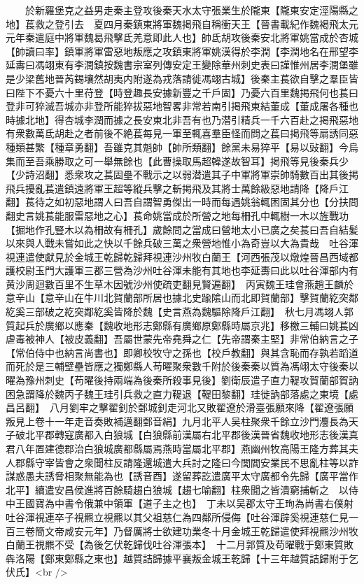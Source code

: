 　　於新羅堡克之益男走秦主登攻後秦天水太守張業生於隴東【隴東安定涇陽縣之地】萇救之登引去　夏四月秦鎮東將軍魏掲飛自稱衝天王【晉書載紀作魏褐飛太元元年秦遣庭中將軍魏曷飛擊氐羌意即此人也】帥氐胡攻後秦安北將軍姚當成於杏城【帥讀曰率】鎮軍將軍雷惡地叛應之攻鎮東將軍姚漢得於李潤【李潤地名在邢望李延夀曰馮翊東有李潤鎮按魏書宗室列傳安定王變除華州刺史表曰謹惟州居李潤堡雖是少梁舊地晉芮錫壤然胡夷内附遂為戎落請徙馮翊古城】後秦主萇欲自擊之羣臣皆曰陛下不憂六十里苻登【時登趣長安據新豐之千戶固】乃憂六百里魏掲飛何也萇曰登非可猝滅吾城亦非登所能猝拔惡地智畧非常若南引掲飛東結董成【董成屠各種也時據北地】得杏城李潤而據之長安東北非吾有也乃潜引精兵一千六百赴之掲飛惡地有衆數萬氐胡赴之者前後不絶萇每見一軍至輒喜羣臣怪而問之萇曰掲飛等扇誘同惡種類甚繁【種章勇翻】吾雖克其魁帥【帥所類翻】餘黨未易猝平【易以䜴翻】今烏集而至吾乘勝取之可一舉無餘也【此曹操取馬超韓遂故智耳】掲飛等見後秦兵少【少詩沼翻】悉衆攻之萇固壘不戰示之以弱潜遣其子中軍將軍崇帥騎數百出其後掲飛兵擾亂萇遣鎮遠將軍王超等縱兵擊之斬掲飛及其將士萬餘級惡地請降【降戶江翻】萇待之如初惡地謂人曰吾自謂智勇傑出一時而每遇姚翁輒困固其分也【分扶問翻史言姚萇能服雷惡地之心】萇命姚當成於所營之地每柵孔中輒樹一木以旌戰功【掘地作孔豎木以為柵故有柵孔】歲餘問之當成曰營地太小已廣之矣萇曰吾自結髪以來與人戰未嘗如此之快以千餘兵破三萬之衆營地惟小為奇豈以大為貴哉　吐谷渾視連遣使獻見於金城王乾歸乾歸拜視連沙州牧白蘭王【河西張茂以燉煌晉昌西域都護校尉玉門大護軍三郡三營為沙州吐谷渾未能有其地也李延夀曰此以吐谷渾部内有黄沙周迴數百里不生草木因號沙州使疏吏翻見賢遍翻】　丙寅魏王珪會燕趙王麟於意辛山【意辛山在牛川北賀蘭部所居也據北史踰隂山而北即賀蘭部】擊賀蘭紇突鄰紇奚三部破之紇突鄰紇奚皆降於魏【史言燕為魏驅除降戶江翻】　秋七月馮翊人郭質起兵於廣鄉以應秦【魏收地形志鄭縣有廣鄉原鄭縣時屬京兆】移檄三輔曰姚萇凶虐毒被神人【被皮義翻】吾屬世蒙先帝堯舜之仁【先帝謂秦主堅】非常伯納言之子【常伯侍中也納言尚書也】即卿校牧守之孫也【校戶教翻】與其含恥而存孰若蹈道而死於是三輔壁壘皆應之獨鄭縣人苟曜聚衆數千附於後秦秦以質為馮翊太守後秦以曜為豫州刺史【苟曜後持兩端為後秦所殺事見後】劉衛辰遣子直力鞮攻賀蘭部賀訥困急謂降於魏丙子魏王珪引兵救之直力鞮退【鞮田黎翻】珪徙訥部落處之東境【處昌呂翻】　八月劉牢之擊翟釗於鄄城釗走河北又敗翟遼於滑臺張願來降【翟遼張願叛見上卷十一年走音奏敗補邁翻鄄音絹】九月北平人吴柱聚衆千餘立沙門灋長為天子破北平郡轉寇廣都入白狼城【白狼縣前漢屬右北平郡後漢晉省魏收地形志後漢真君八年置建德郡治白狼城廣都縣屬焉燕時當屬北平郡】燕幽州牧高陽王隆方葬其夫人郡縣守宰皆會之衆聞柱反請隆還城遣大兵討之隆曰今閭閻安業民不思亂柱等以詐謀惑愚夫誘脅相聚無能為也【誘音酉】遂留葬訖遣廣平太守廣都令先歸【廣平當作北平】續遣安昌侯進將百餘騎趨白狼城【趨七喻翻】柱衆聞之皆潰窮捕斬之　以侍中王國寶為中書令俄兼中領軍【道子主之也】　丁未以吴郡太守王珣為尚書右僕射　吐谷渾視連卒子視羆立視羆以其父祖慈仁為四鄰所侵侮【吐谷渾辟奚視連慈仁見一百三卷簡文帝咸安元年】乃督厲將士欲建功業冬十月金城王乾歸遣使拜視羆沙州牧白蘭王視羆不受【為後乞伏乾歸伐吐谷渾張本】　十二月郭質及苟曜戰于鄭東質敗犇洛陽【鄭東鄭縣之東也】越質詰歸據平襄叛金城王乾歸【十三年越質詰歸附于乞伏氏】<br />
